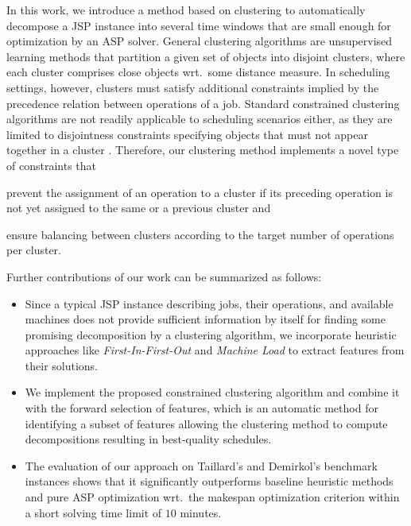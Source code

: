 \documentclass[runningheads]{llncs}
\begin{document}
In this work, we introduce a method based on clustering to automatically decompose a JSP instance into several time windows that are small enough for optimization by an ASP solver.
General clustering algorithms are unsupervised learning methods that partition a given set of objects into disjoint clusters, where each cluster comprises close objects wrt.\ some distance measure. 
In scheduling settings, however, clusters must satisfy additional constraints implied by the precedence relation between operations of a job. Standard constrained clustering algorithms are not readily applicable to scheduling scenarios either, as they are limited to disjointness constraints specifying objects that must not appear together in a cluster \cite{zhang2019framework,wagstaff2001constrained,ding2020unified}. 
Therefore, our clustering method implements a novel type of constraints that
\begin{enumerate*}[label=\emph{(\roman*)}]
  \item prevent the assignment of an operation to a cluster if its preceding operation is not yet assigned to the same or a previous cluster and
  \item ensure balancing between clusters according to the target number of operations per cluster.
\end{enumerate*}
Further contributions of our work can be summarized as follows:
\begin{itemize}
  \item Since a typical JSP instance describing jobs, their operations, and available machines does not provide sufficient information by itself for finding some promising decomposition by a clustering algorithm, we incorporate heuristic approaches like \textit{First-In-First-Out} and \textit{Machine Load} to extract features from their solutions.
  \item We implement the proposed constrained clustering algorithm and combine it with the forward selection of features, which is an automatic method for identifying a subset of features allowing the clustering method to compute decompositions resulting in best-quality schedules.
  \item The evaluation of our approach on Taillard's and Demirkol's benchmark instances \cite{taillard1993benchmarks, demirkol1998benchmarks} shows that it significantly outperforms baseline heuristic methods and pure ASP optimization wrt.\ the makespan optimization criterion within a short solving time limit of $10$ minutes.
\end{itemize}
\end{document}
